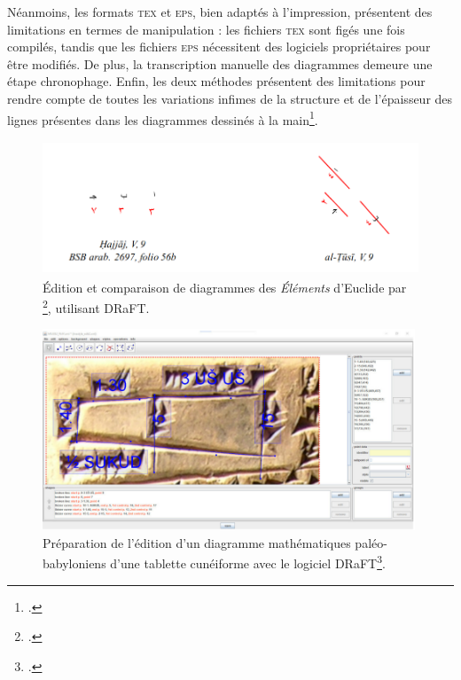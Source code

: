 Néanmoins, les formats \textsc{tex} et \textsc{eps}, bien adaptés à l'impression,
présentent des limitations en termes de manipulation : les fichiers \textsc{tex}
sont figés une fois compilés, tandis que les fichiers \textsc{eps} nécessitent
des logiciels propriétaires pour être modifiés. De plus, la
transcription manuelle des diagrammes demeure une étape chronophage. Enfin, les deux méthodes présentent des limitations pour rendre compte de toutes les variations infimes de la structure et de l'épaisseur des lignes présentes dans les diagrammes dessinés à la main\footcite[``When a line has a very noticeable thickness, for example, should one choose points on the outer edge of the line, the inner edge, or somewhere in the middle ? When the scribe produces a distinctly rounded vertex to a quadrilateral, should one choose the point of the vertex to be somewhere in the rounded portion of the line or should the editor choose a point outside the line where the two sides would intersect if continued rectilinearly ?''][]{de_young_diagrams_2009}. 

\begin{figure}[H]
          \begin{center}
          \includegraphics[height=4cm]{figues/diagrammes_de_young.png}
          \end{center}
          \caption{Édition et comparaison de diagrammes des \textit{Éléments} d'Euclide par \citeauthor{de_young_editing_2014}\footcite[p.193]{de_young_diagrams_2009}, utilisant DRaFT.}
          \label{fig:diag_de_young} \end{figure}

\begin{figure}[H]
	\begin{center}
		\includegraphics[height=6cm]{figues/diagrammes_de_reynaud.png}
	\end{center}
	\caption{Préparation de l’édition d’un diagramme mathématiques paléo-babyloniens d'une tablette cunéiforme avec le logiciel DRaFT\footcite[Cette capture d'écran est issue du travail de thèse de][p.293]{reynaud_diagrammes_2017}.}
	\label{fig:diag_reynaud} \end{figure}

